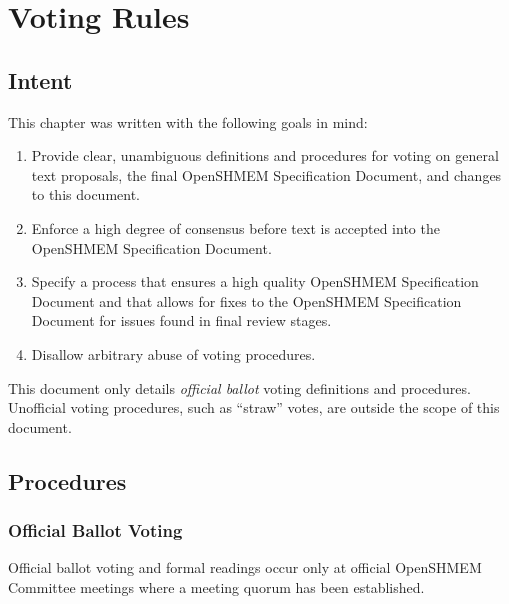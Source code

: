 \chapter{Voting Rules}


\section{Intent}

This chapter was written with the following goals in mind:

\begin{enumerate}
\item Provide clear, unambiguous definitions and procedures for voting
  on general text proposals, the final
  OpenSHMEM Specification Document, and changes to this document.
\item Enforce a high degree of consensus before text is accepted into
  the OpenSHMEM Specification Document.
\item Specify a process that ensures a high quality
  OpenSHMEM Specification Document and that allows for fixes to the
  OpenSHMEM Specification Document for issues found in final review stages.
\item Disallow arbitrary abuse of voting procedures.
\end{enumerate}

This document only details {\em official ballot} voting definitions
and procedures.  Unofficial voting procedures, such as ``straw''
votes, are outside the scope of this document.


\section{Procedures}


\subsection{Official Ballot Voting}
\label{subsec:official-ballot-voting}

Official ballot voting and formal readings occur only at official OpenSHMEM
Committee meetings where a meeting quorum has been established.

